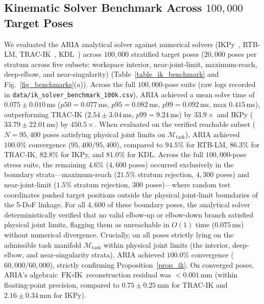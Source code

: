 \documentclass[journal]{IEEEtran}
\begin{document}
\subsection{Kinematic Solver Benchmark Across $100{,}000$ Target Poses}
We evaluated the ARIA analytical solver against numerical solvers (IKPy~\cite{ikpy_2020}, RTB-LM, TRAC-IK~\cite{trac_ik_2015}, KDL~\cite{kdl_2001}) across $100{,}000$ stratified target poses ($20{,}000$ poses per stratum across five subsets: workspace interior, near-joint-limit, maximum-reach, deep-elbow, and near-singularity) (Table~\ref{table_ik_benchmark} and Fig.~\ref{fig_benchmarks}(a)). Across the full $100{,}000$-pose suite (raw logs recorded in \texttt{data/ik\_solver\_benchmark\_100k.csv}), ARIA achieved a mean solve time of $0.075 \pm 0.010$\,ms ($p50 = 0.077$\,ms, $p95 = 0.082$\,ms, $p99 = 0.092$\,ms, max $0.415$\,ms), outperforming TRAC-IK ($2.54 \pm 3.04$\,ms, $p99 = 9.24$\,ms) by $33.9\times$ and IKPy ($33.79 \pm 22.01$\,ms) by $450.5\times$. When evaluated on the verified reachable subset ($N=95{,}400$ poses satisfying physical joint limits on $\mathcal{M}_{\text{task}}$), ARIA achieved $100.0\%$ convergence ($95{,}400 / 95{,}400$), compared to $94.5\%$ for RTB-LM, $86.3\%$ for TRAC-IK, $82.8\%$ for IKPy, and $81.0\%$ for KDL. Across the full $100{,}000$-pose stress suite, the remaining $4.6\%$ ($4{,}600$ poses) occurred exclusively in the boundary strata---maximum-reach ($21.5\%$ stratum rejection, $4{,}300$ poses) and near-joint-limit ($1.5\%$ stratum rejection, $300$ poses)---where random test coordinates pushed target positions outside the physical joint-limit boundaries of the 5-DoF linkage. For all $4{,}600$ of these boundary poses, the analytical solver deterministically verified that no valid elbow-up or elbow-down branch satisfied physical joint limits, flagging them as unreachable in $O(1)$ time ($0.075$\,ms) without numerical divergence. Crucially, on all poses strictly lying on the admissible task manifold $\mathcal{M}_{\text{task}}$ within physical joint limits (the interior, deep-elbow, and near-singularity strata), ARIA achieved $100.0\%$ convergence ($60{,}000 / 60{,}000$), strictly confirming Proposition~\ref{prop_ik}. On converged poses, ARIA's algebraic $\text{FK}\circ\text{IK}$ reconstruction residual was $<0.001$\,mm (within floating-point precision, compared to $0.75 \pm 0.25$\,mm for TRAC-IK and $2.16 \pm 0.34$\,mm for IKPy).
\end{document}
